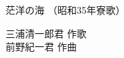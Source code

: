 \documentclass[10pt,b5j]{tarticle} %
\begin{document}
\begin{minipage}[c]{0.7\hsize} %
    \begin{center}
        {\LARGE
            茫洋の海 %
        }
        {\small 
            （昭和35年寮歌） %
        }
    \end{center}
\end{minipage}
\begin{minipage}[c]{0.3\hsize} %
    \begin{flushright} %
        三浦清一郎君 作歌\\前野紀一君 作曲 %
    \end{flushright}
\end{minipage}
\end{document}
